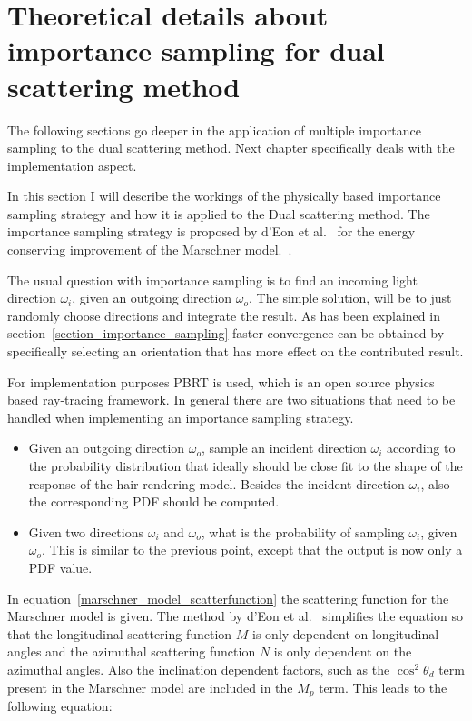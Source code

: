\documentclass[11pt,a4paper]{report}
\begin{document}
\section{Theoretical details about importance sampling for dual scattering method}

The following sections go deeper in the application of multiple importance sampling to the dual scattering method. Next chapter specifically deals with the implementation aspect.


In this section I will describe the workings of the physically based importance sampling strategy and how it is applied to the Dual scattering method. The importance sampling strategy is proposed by d'Eon et al.~\cite{eon2013} for the energy conserving improvement of the Marschner model.~\cite{eon2011}.

The usual question with importance sampling is to find an incoming light direction $\omega_i$, given an outgoing direction $\omega_o$. The simple solution, will be to just randomly choose directions and integrate the result. As has been explained in section~\ref{section_importance_sampling} faster convergence can be obtained by specifically selecting an orientation that has more effect on the contributed result.

For implementation purposes PBRT is used, which is an open source physics based ray-tracing framework. In general there are two situations that need to be handled when implementing an importance sampling strategy.

\begin{itemize}
\item Given an outgoing direction $\omega_o$, sample an incident direction $\omega_i$ according to the probability distribution that ideally should be close fit to the shape of the response of the hair rendering model. Besides the incident direction $\omega_i$, also the corresponding PDF should be computed.
\item Given two directions $\omega_i$ and $\omega_o$, what is the probability of sampling $\omega_i$, given $\omega_o$. This is similar to the previous point, except that the output is now only a PDF value.
\end{itemize}

In equation~\ref{marschner_model_scatterfunction} the scattering function for the Marschner model is given. The method by d'Eon et al.~\cite{eon2011} simplifies the equation so that the longitudinal scattering function $M$ is only dependent on longitudinal angles and the azimuthal scattering function $N$ is only dependent on the azimuthal angles. Also the inclination dependent factors, such as the $\cos^2 \theta_d$ term present in the Marschner model are included in the $M_p$ term. This leads to the following equation:
\end{document}
